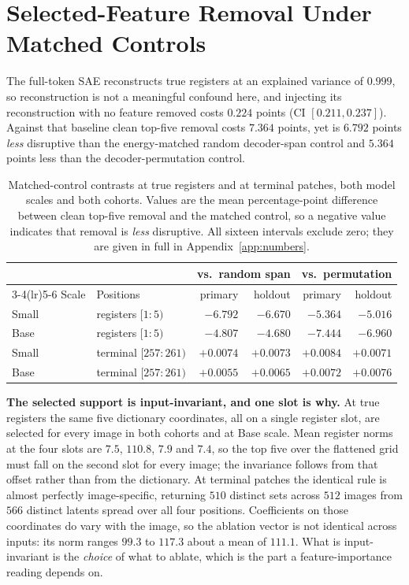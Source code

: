 \documentclass{article}
\begin{document}
\section{Selected-Feature Removal Under Matched Controls}
\label{sec:main}

The full-token SAE reconstructs true registers at an explained variance of $0.999$, so reconstruction is not a meaningful confound here, and injecting its reconstruction with no feature removed costs $0.224$ points (CI $[0.211,0.237]$). Against that baseline clean top-five removal costs $7.364$ points, yet is $6.792$ points \emph{less} disruptive than the energy-matched random decoder-span control and $5.364$ points less than the decoder-permutation control.

\begin{table}[t]
\centering
\caption{Matched-control contrasts at true registers and at terminal patches, both model scales and both cohorts. Values are the mean percentage-point difference between clean top-five removal and the matched control, so a negative value indicates that removal is \emph{less} disruptive. All sixteen intervals exclude zero; they are given in full in Appendix~\ref{app:numbers}.}
\label{tab:replication-grid}
\begin{tabular}{llrrrr}
\toprule
& & \multicolumn{2}{c}{vs.\ random span} & \multicolumn{2}{c}{vs.\ permutation} \\
\cmidrule(lr){3-4}\cmidrule(lr){5-6}
Scale & Positions & primary & holdout & primary & holdout \\
\midrule
Small & registers $[1{:}5)$    & $-6.792$  & $-6.670$  & $-5.364$  & $-5.016$ \\
Base  & registers $[1{:}5)$    & $-4.807$  & $-4.680$  & $-7.444$  & $-6.960$ \\
Small & terminal $[257{:}261)$ & $+0.0074$ & $+0.0073$ & $+0.0084$ & $+0.0071$ \\
Base  & terminal $[257{:}261)$ & $+0.0055$ & $+0.0065$ & $+0.0072$ & $+0.0076$ \\
\bottomrule
\end{tabular}
\end{table}

\textbf{The selected support is input-invariant, and one slot is why.} At true registers the same five dictionary coordinates, all on a single register slot, are selected for every image in both cohorts and at Base scale. Mean register norms at the four slots are $7.5$, $110.8$, $7.9$ and $7.4$, so the top five over the flattened grid must fall on the second slot for every image; the invariance follows from that offset rather than from the dictionary. At terminal patches the identical rule is almost perfectly image-specific, returning $510$ distinct sets across $512$ images from $566$ distinct latents spread over all four positions. Coefficients on those coordinates do vary with the image, so the ablation vector is not identical across inputs: its norm ranges $99.3$ to $117.3$ about a mean of $111.1$. What is input-invariant is the \emph{choice} of what to ablate, which is the part a feature-importance reading depends on.
\end{document}
